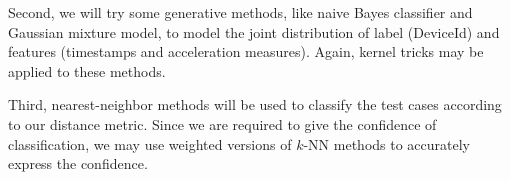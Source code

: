 \documentclass[12pt]{article}
\begin{document}
Second, we will try some generative methods, like naive Bayes classifier and Gaussian mixture model, to model the joint distribution of label (DeviceId) and features (timestamps and acceleration measures). Again, kernel tricks may be applied to these methods.

Third, nearest-neighbor methods will be used to classify the test cases according to our distance metric. Since we are required to give the confidence of classification, we may use weighted versions of $k$-NN methods to accurately express the confidence.
\end{document}
